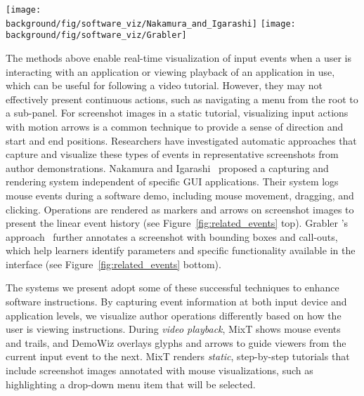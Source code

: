 \begin{figure*}[t!]
  \centering
  \texttt{[image: \\background/fig/software\_viz/Nakamura\_and\_Igarashi]}
  \texttt{[image: \\background/fig/software\_viz/Grabler]}
  \caption{Examples where software operations are automatically rendered on top of application screenshots, including (top) moving the mouse, dragging, clicking, and scrolling by Nakamura and Igarashi~\cite{Nakamura:2008:ASV:1449715.1449721} and (bottom) application-specific operations (a-b), parameter setting (c-f), and image manipulations (g-f) by Grabler \ea{}~\cite{Grabler:2009jj}.}
  \label{fig:related_events}
\end{figure*}

The methods above enable real-time visualization of input events when a user is interacting with an application or viewing playback of an application in use, which can be useful for following a video tutorial. However, they may not effectively present continuous actions, such as navigating a menu from the root to a sub-panel. For screenshot images in a static tutorial, visualizing input actions with motion arrows is a common technique to provide a sense of direction and start and end positions.
%
Researchers have investigated automatic approaches that capture and visualize these types of events in representative screenshots from author demonstrations. Nakamura and Igarashi~\cite{Nakamura:2008:ASV:1449715.1449721} proposed a capturing and rendering system independent of specific GUI applications. Their system logs mouse events during a software demo, including mouse movement, dragging, and clicking. Operations are rendered as markers and arrows on screenshot images to present the linear event history (see Figure~\ref{fig:related_events} top).
%
Grabler \ea{}'s approach~\cite{Grabler:2009jj} further annotates a screenshot with bounding boxes and call-outs, which help learners identify parameters and specific functionality available in the interface (see Figure~\ref{fig:related_events} bottom).

The systems we present adopt some of these successful techniques to enhance software instructions. By capturing event information at both input device and application levels, we visualize author operations differently based on how the user is viewing instructions.
%
During \emph{video playback}, MixT shows mouse events and trails, and DemoWiz overlays glyphs and arrows to guide viewers from the current input event to the next.
%
MixT renders \emph{static}, step-by-step tutorials that include screenshot images annotated with mouse visualizations, such as highlighting a drop-down menu item that will be selected.


